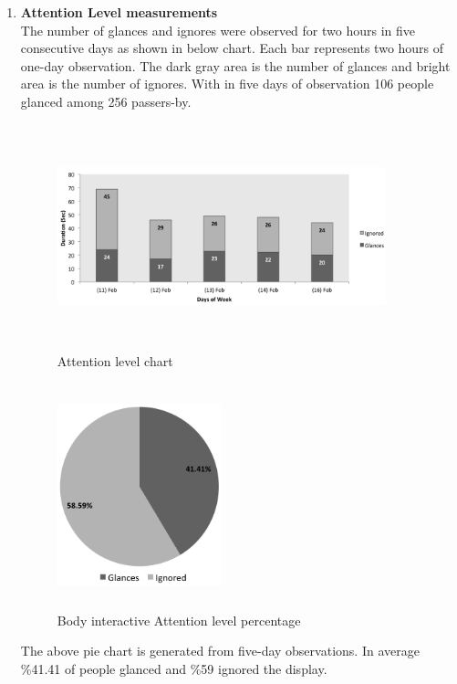 \begin{enumerate}
\item \textbf{Attention Level measurements} \\
The number of glances and ignores were observed for two hours in five consecutive days as shown in below chart. Each bar represents two hours of one-day observation. The dark gray area is the number of glances and bright area is the number of ignores. With in five days of observation 106 people glanced among 256 passers-by.
\begin{figure}[H]
    \centering
    \includegraphics[width=0.9\textwidth,height=6.5cm]{Figures/8/body_inter_findings/Body_Inter_chart}%
    \caption{Attention level chart}%
    \label{fig:bodyattentionlevelchart}%
\end{figure}


\begin{figure}[H]
    \centering
    \includegraphics[width=0.45\textwidth,height=6.5cm]{Figures/8/body_inter_findings/body_inter_percentage}
    \caption{Body interactive Attention level percentage}%
    \label{fig:bodyattentionlevelpercentage}%
\end{figure}

The above pie chart is generated from five-day observations. In average \%41.41 of people glanced and \%59 ignored the display. 


\end{enumerate}
